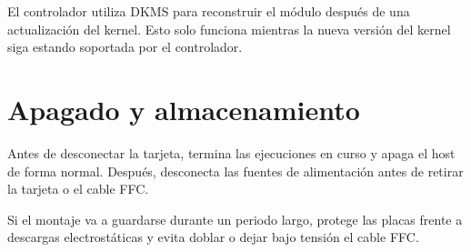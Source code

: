 El controlador utiliza DKMS para reconstruir el módulo después de una actualización del
kernel. Esto solo funciona mientras la nueva versión del kernel siga estando soportada por
el controlador.

\section{Apagado y almacenamiento}

Antes de desconectar la tarjeta, termina las ejecuciones en curso y apaga el host de forma
normal. Después, desconecta las fuentes de alimentación antes de retirar la tarjeta o el
cable FFC.

Si el montaje va a guardarse durante un periodo largo, protege las placas frente a descargas
electrostáticas y evita doblar o dejar bajo tensión el cable FFC.